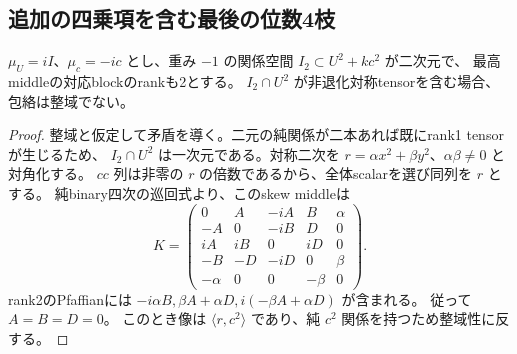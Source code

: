 \subsection{追加の四乗項を含む最後の位数4枝}
\label{subsec:cubic-fourth-root-last-negative-simple}
\begin{lemma}[重複第四根と対称な純二次関係の障害]
\label{lem:cubic-fourth-root-symmetric-pure-obstruction}
$\mu_U=iI$、$\mu_c=-ic$ とし、重み $-1$ の関係空間 $I_2\subset U^2+kc^2$ が二次元で、
最高middleの対応blockのrankも2とする。
$I_2\cap U^2$ が非退化対称tensorを含む場合、包絡は整域でない。
\end{lemma}
\begin{proof}
整域と仮定して矛盾を導く。二元の純関係が二本あれば既にrank1 tensorが生じるため、
$I_2\cap U^2$ は一次元である。対称二次を $r=\alpha x^2+\beta y^2$、$\alpha\beta\ne0$ と対角化する。
$cc$ 列は非零の $r$ の倍数であるから、全体scalarを選び同列を $r$ とする。
純binary四次の巡回式より、このskew middleは
\[
 K=\begin{pmatrix}
 0&A&-iA&B&\alpha\\
 -A&0&-iB&D&0\\
 iA&iB&0&iD&0\\
 -B&-D&-iD&0&\beta\\
 -\alpha&0&0&-\beta&0
 \end{pmatrix}.
\]
rank2のPfaffianには $-i\alpha B,\beta A+\alpha D,
 i(-\beta A+\alpha D)$ が含まれる。
従って $A=B=D=0$。
このとき像は $\langle r,c^2\rangle$ であり、純 $c^2$ 関係を持つため整域性に反する。
\end{proof}


